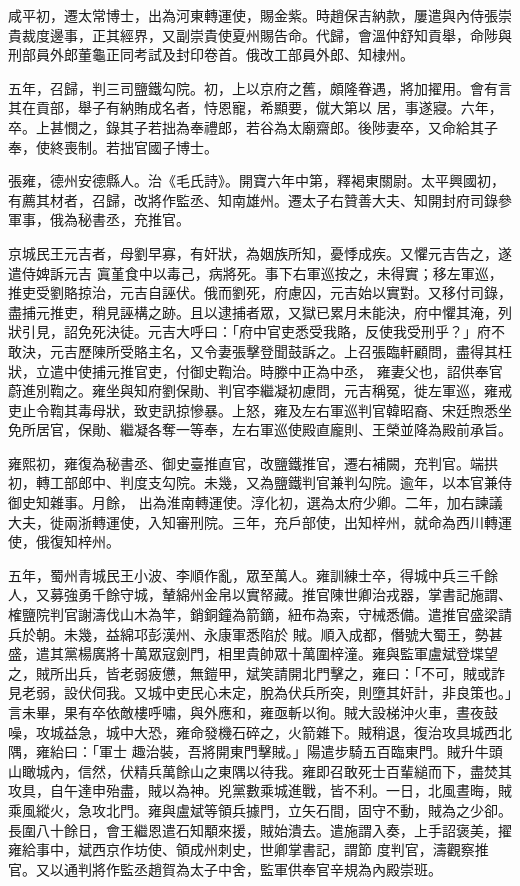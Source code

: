 \begin{pinyinscope}
 咸平初，遷太常博士，出為河東轉運使，賜金紫。時趙保吉納款，屢遣與內侍張崇貴裁度邊事，正其經界，又副崇貴使夏州賜告命。代歸，會溫仲舒知貢舉，命陟與刑部員外郎董龜正同考試及封印卷首。俄改工部員外郎、知棣州。



 五年，召歸，判三司鹽鐵勾院。初，上以京府之舊，頗隆眷遇，將加擢用。會有言其在貢部，舉子有納賄成名者，恃恩寵，希顯要，僦大第以
 居，事遂寢。六年，卒。上甚憫之，錄其子若拙為奉禮郎，若谷為太廟齋郎。後陟妻卒，又命給其子奉，使終喪制。若拙官國子博士。



 張雍，德州安德縣人。治《毛氏詩》。開寶六年中第，釋褐東關尉。太平興國初，有薦其材者，召歸，改將作監丞、知南雄州。遷太子右贊善大夫、知開封府司錄參軍事，俄為秘書丞，充推官。



 京城民王元吉者，母劉早寡，有奸狀，為姻族所知，憂悸成疾。又懼元吉告之，遂遣侍婢訴元吉
 寘堇食中以毒己，病將死。事下右軍巡按之，未得實；移左軍巡，推吏受劉賂掠治，元吉自誣伏。俄而劉死，府慮囚，元吉始以實對。又移付司錄，盡捕元推吏，稍見誣構之跡。且以逮捕者眾，又獄已累月未能決，府中懼其淹，列狀引見，詔免死決徒。元吉大呼曰：「府中官吏悉受我賂，反使我受刑乎？」府不敢決，元吉歷陳所受賂主名，又令妻張擊登聞鼓訴之。上召張臨軒顧問，盡得其枉狀，立遣中使捕元推官吏，付御史鞫治。時滕中正為中丞，
 雍妻父也，詔供奉官蔚進別鞫之。雍坐與知府劉保勛、判官李繼凝初慮問，元吉稱冤，徙左軍巡，雍戒吏止令鞫其毒母狀，致吏訊掠慘暴。上怒，雍及左右軍巡判官韓昭裔、宋廷煦悉坐免所居官，保勛、繼凝各奪一等奉，左右軍巡使殿直龐則、王榮並降為殿前承旨。



 雍熙初，雍復為秘書丞、御史臺推直官，改鹽鐵推官，遷右補闕，充判官。端拱初，轉工部郎中、判度支勾院。未幾，又為鹽鐵判官兼判勾院。逾年，以本官兼侍御史知雜事。月餘，
 出為淮南轉運使。淳化初，選為太府少卿。二年，加右諫議大夫，徙兩浙轉運使，入知審刑院。三年，充戶部使，出知梓州，就命為西川轉運使，俄復知梓州。



 五年，蜀州青城民王小波、李順作亂，眾至萬人。雍訓練士卒，得城中兵三千餘人，又募強勇千餘守城，輦綿州金帛以實帑藏。推官陳世卿治戎器，掌書記施謂、榷鹽院判官謝濤伐山木為竿，銷銅鐘為箭鏑，紐布為索，守械悉備。遣推官盛梁請兵於朝。未幾，益綿邛彭漢州、永康軍悉陷於
 賊。順入成都，僭號大蜀王，勢甚盛，遣其黨楊廣將十萬眾寇劍門，相里貴帥眾十萬圍梓潼。雍與監軍盧斌登堞望之，賊所出兵，皆老弱疲憊，無鎧甲，斌笑請開北門擊之，雍曰：「不可，賊或詐見老弱，設伏伺我。又城中吏民心未定，脫為伏兵所突，則墮其奸計，非良策也。」言未畢，果有卒依敵樓呼嘯，與外應和，雍亟斬以徇。賊大設梯沖火車，晝夜鼓噪，攻城益急，城中大恐，雍命發機石碎之，火箭雜下。賊稍退，復治攻具城西北隅，雍紿曰：「軍士
 趣治裝，吾將開東門擊賊。」陽遣步騎五百臨東門。賊升牛頭山瞰城內，信然，伏精兵萬餘山之東隅以待我。雍即召敢死士百輩縋而下，盡焚其攻具，自午達申殆盡，賊以為神。兇黨數乘城進戰，皆不利。一日，北風晝晦，賊乘風縱火，急攻北門。雍與盧斌等領兵據門，立矢石間，固守不動，賊為之少卻。長圍八十餘日，會王繼恩遣石知顒來援，賊始潰去。遣施謂入奏，上手詔褒美，擢雍給事中，斌西京作坊使、領成州刺史，世卿掌書記，謂節
 度判官，濤觀察推官。又以通判將作監丞趙賀為太子中舍，監軍供奉官辛規為內殿崇班。




\end{pinyinscope}
